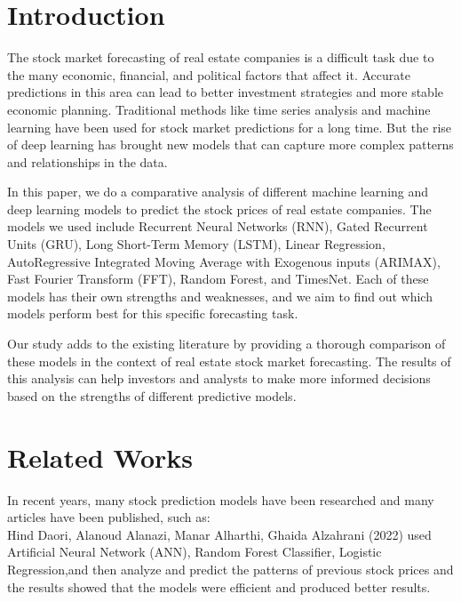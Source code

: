 \documentclass{ieeeojies}
\begin{document}
\titlepgskip=-15pt

\maketitle

\section{Introduction}
\label{sec:introduction}
The stock market forecasting of real estate companies is a difficult task due to the many economic, financial, and political factors that affect it. Accurate predictions in this area can lead to better investment strategies and more stable economic planning. Traditional methods like time series analysis and machine learning have been used for stock market predictions for a long time. But the rise of deep learning has brought new models that can capture more complex patterns and relationships in the data.

In this paper, we do a comparative analysis of different machine learning and deep learning models to predict the stock prices of real estate companies. The models we used include Recurrent Neural Networks (RNN), Gated Recurrent Units (GRU), Long Short-Term Memory (LSTM), Linear Regression, AutoRegressive Integrated Moving Average with Exogenous inputs (ARIMAX), Fast Fourier Transform (FFT), Random Forest, and TimesNet. Each of these models has their own strengths and weaknesses, and we aim to find out which models perform best for this specific forecasting task.

Our study adds to the existing literature by providing a thorough comparison of these models in the context of real estate stock market forecasting. The results of this analysis can help investors and analysts to make more informed decisions based on the strengths of different predictive models.
\section{Related Works}

In recent years, many stock prediction models have been researched and many articles have been published, such as: \\

Hind Daori, Alanoud Alanazi, Manar Alharthi, Ghaida Alzahrani (2022)\cite{b1} used Artificial Neural Network (ANN), Random Forest
Classifier, Logistic Regression,and then analyze and predict the
patterns of previous stock prices and the results showed that the models were efficient and produced better results.\\
\end{document}
